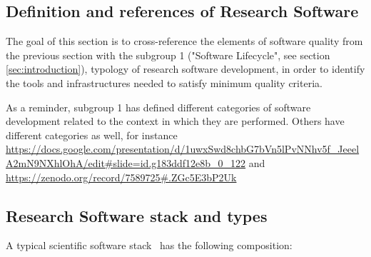 \subsection{Definition and references of Research Software}



The goal of this section is to cross-reference the elements of software quality from the previous section with the subgroup 1 \cite{sg1tf2023} ("Software Lifecycle", see section \ref{sec:introduction}), typology of research software development, in order to identify the tools and infrastructures needed to satisfy minimum quality criteria. 

As a reminder, subgroup 1 has defined different categories of software development related to the context in which they are performed. Others have different categories as well, for instance \url{https://docs.google.com/presentation/d/1uwxSwd8chbG7bVn5lPvNNhv5f_JeeelA2mN9NXhlOhA/edit#slide=id.g183ddf12e8b_0_122} and \url{https://zenodo.org/record/7589725#.ZGc5E3bP2Uk}

\subsection{Research Software stack and types}

A typical scientific software stack~\cite{hinsen2019} has the following composition:

